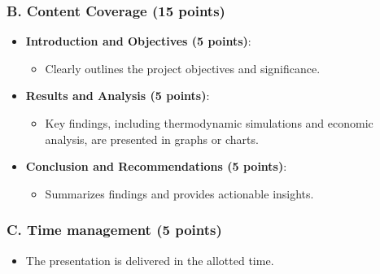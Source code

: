 \documentclass[11pt]{article}
\begin{document}
\subsubsection*{B. Content Coverage (15 points)}
\begin{itemize}
    \item \textbf{Introduction and Objectives (5 points)}:
    \begin{itemize}
        \item Clearly outlines the project objectives and significance.
    \end{itemize}
    \item \textbf{Results and Analysis (5 points)}:
    \begin{itemize}
        \item Key findings, including thermodynamic simulations and economic analysis, are presented in graphs or charts.
    \end{itemize}
    \item \textbf{Conclusion and Recommendations (5 points)}:
    \begin{itemize}
        \item Summarizes findings and provides actionable insights.
    \end{itemize}
\end{itemize}

\subsubsection*{C. Time management (5 points)}
\begin{itemize}
    \item The presentation is delivered in the allotted time.
\end{itemize}

\newpage
\end{document}
